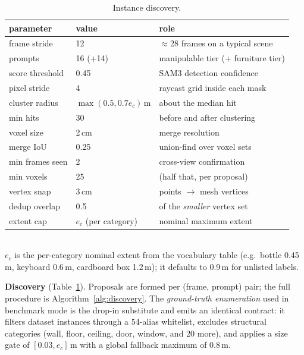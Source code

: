 \begin{table}[htbp]
\caption{Instance discovery.}
\label{tab:s-discovery}
\centering\footnotesize\setlength{\tabcolsep}{4pt}
\begin{tabular}{@{}p{26mm}p{20mm}p{28mm}@{}}
\toprule
parameter & value & role \\
\midrule
frame stride & 12 & $\approx$28 frames on a typical scene \\
prompts & 16 (+14) & manipulable tier (+ furniture tier) \\
score threshold & 0.45 & SAM3 detection confidence \\
pixel stride & 4 & raycast grid inside each mask \\
cluster radius & $\max(0.5, 0.7 e_c)$\,m & about the median hit \\
min hits & 30 & before and after clustering \\
voxel size & 2\,cm & merge resolution \\
merge IoU & 0.25 & union-find over voxel sets \\
min frames seen & 2 & cross-view confirmation \\
min voxels & 25 & (half that, per proposal) \\
vertex snap & 3\,cm & points $\rightarrow$ mesh vertices \\
dedup overlap & 0.5 & of the \emph{smaller} vertex set \\
extent cap & $e_c$ (per category) & nominal maximum extent \\
\bottomrule
\end{tabular}\\[3pt]
{\footnotesize $e_c$ is the per-category nominal extent from the
vocabulary table (e.g.\ bottle 0.45\,m, keyboard 0.6\,m, cardboard box
1.2\,m); it defaults to 0.9\,m for unlisted labels.}
\end{table}

\textbf{Discovery} (Table~\ref{tab:s-discovery}). Proposals are formed
per (frame, prompt) pair; the full procedure is
Algorithm~\ref{alg:discovery}. The \emph{ground-truth enumeration} used in
benchmark mode is the drop-in substitute and emits an identical contract:
it filters dataset instances through a 54-alias whitelist, excludes
structural categories (wall, floor, ceiling, door, window, and 20 more),
and applies a size gate of $[0.03, e_c]$\,m with a global fallback
maximum of 0.8\,m.

